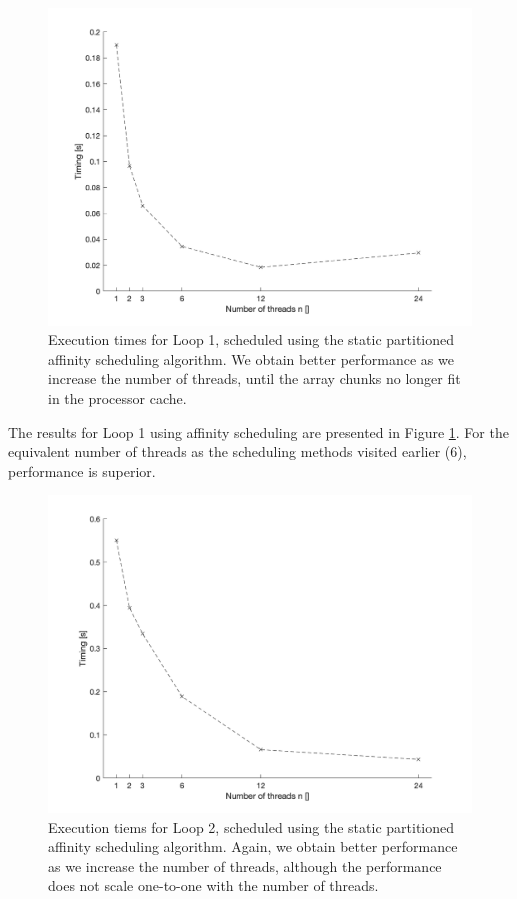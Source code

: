 \documentclass{article} %
\begin{document}
\begin{figure}
    \centering
    \includegraphics[width=.8\textwidth]{part2_plots/affinity_loop1}
    \caption{Execution times for Loop 1, scheduled using the static partitioned affinity scheduling algorithm. We obtain better performance as we increase the number of threads, until the array chunks no longer fit in the processor cache.}
    \label{fig:affinityloop1}
\end{figure}

The results for Loop 1 using affinity scheduling are presented in Figure \ref{fig:affinityloop1}. 
For the equivalent number of threads as the scheduling methods visited earlier (6), performance is superior.

\begin{figure}
    \centering
    \includegraphics[width=.8\textwidth]{part2_plots/affinity_loop2}
    \caption{Execution tiems for Loop 2, scheduled using the static partitioned affinity scheduling algorithm. Again, we obtain better performance as we increase the number of threads, although the performance does not scale one-to-one with the number of threads.}
    \label{fig:affinityloop2}
\end{figure}
\end{document}
